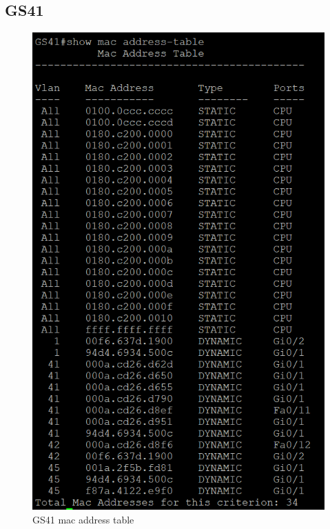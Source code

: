 \documentclass{article}
\begin{document}
\subsection{GS41}
\begin{figure}[!htp]
  \centering
  \begin{minipage}[b]{0.45\textwidth}
    \includegraphics[width=\textwidth]{Arbeitsergebnisse/GS41/gs41_mac_address-table.png}
    \caption{GS41 mac address table}
  \end{minipage}
\end{figure}
\end{document}
